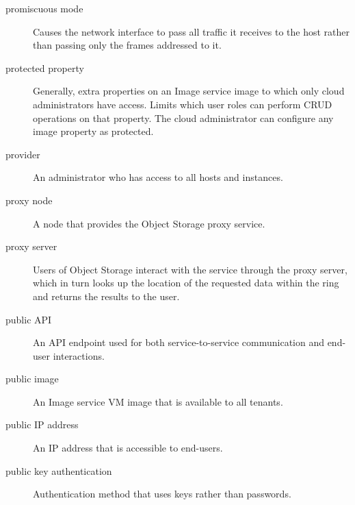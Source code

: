 \documentclass[letterpaper,10pt,english]{sphinxmanual}
\begin{document}
\begin{description}
\item[{promiscuous mode}] \leavevmode{}\label{_source/glossary:term-promiscuous-mode}
Causes the network interface to pass all traffic it
receives to the host rather than passing only the frames
addressed to it.

\item[{protected property}] \leavevmode{}\label{_source/glossary:term-protected-property}
Generally, extra properties on an Image service image to
which only cloud administrators have access. Limits which user
roles can perform CRUD operations on that property. The cloud
administrator can configure any image property as
protected.

\item[{provider}] \leavevmode{}\label{_source/glossary:term-provider}
An administrator who has access to all hosts and
instances.

\item[{proxy node}] \leavevmode{}\label{_source/glossary:term-proxy-node}
A node that provides the Object Storage proxy service.

\item[{proxy server}] \leavevmode{}\label{_source/glossary:term-proxy-server}
Users of Object Storage interact with the service through the
proxy server, which in turn looks up the location of the requested
data within the ring and returns the results to the user.

\item[{public API}] \leavevmode{}\label{_source/glossary:term-public-api}
An API endpoint used for both service-to-service communication
and end-user interactions.

\item[{public image}] \leavevmode{}\label{_source/glossary:term-public-image}
An Image service VM image that is available to all
tenants.

\item[{public IP address}] \leavevmode{}\label{_source/glossary:term-public-ip-address}
An IP address that is accessible to end-users.

\item[{public key authentication}] \leavevmode{}\label{_source/glossary:term-public-key-authentication}
Authentication method that uses keys rather than
passwords.


\end{description}
\end{document}
